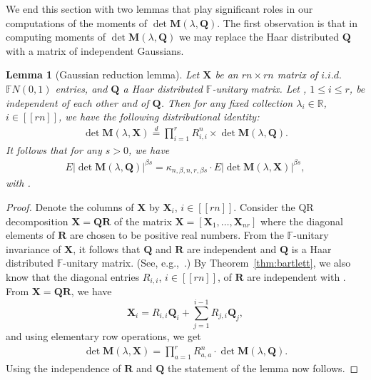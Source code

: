 \documentclass[pdftex]{sigma}
\numberwithin{equation}{section}
\newtheorem{Lemma}[Theorem]{Lemma}
\theoremstyle{definition}
\newcommand{\FF}{{\mathbb{F}}}
\newcommand{\R}{{\mathbb R}}
\def\eqd{\stackrel{d}{=}}
\newcommand{\lst}[1]{[\![#1 ]\!]}
\newcommand{\mbf}[1]{\mathbf{#1}}
\begin{document}
We end this section with two lemmas that play significant roles in our computations of the moments of $\det \mbf{M}({\lambda}, \mbf{Q})$. The first observation is that in computing moments of $\det \mbf{M}({\lambda}, \mbf{Q})$ we may replace the Haar distributed $\mbf{Q}$ with a matrix of independent Gaussians.


\begin{Lemma}[Gaussian reduction lemma]\label{lem:Gauss_red}
Let $\mbf{X}$ be an $rn \times rn$ matrix of $i.i.d.$ $\mathbb{F} N(0,1)$ entries, and $\mbf{Q}$ a Haar distributed $\mathbb{F}$-unitary matrix.
Let , $1\le i\le r$, be
independent of each other and of $\mbf{Q}$.
Then for any fixed collection $\lambda_i\in \R$, $i \in \lst{rn}$, we have the following distributional identity:
\begin{align*}
\det \mbf{M}({\lambda}, \mbf{X})\eqd \prod_{i=1}^{r} R_{i,i}^n \times
\det \mbf{M}({\lambda}, \mbf{Q}).
\end{align*}
It follows that for any $s>0$, we have
\begin{align*}
 E |{\det \mbf{M}({\lambda}, \mbf{Q})}|^{\beta s}=\kappa_{n,\beta, n,r, \beta s}
\cdot E |{\det \mbf{M}({\lambda}, \mbf{X})}|^{\beta s},
\end{align*}
with .
\end{Lemma}

\begin{proof}
Denote the columns of $\mbf{X}$ by $\mbf{X}_i$, $i\in \lst{rn}$. Consider the QR decomposition $\mathbf{X}=\mathbf{Q}\mathbf{R}$ of the matrix $\mathbf{X}=[\mathbf{X}_1, \dots, \mathbf{X}_{nr}]$ where the diagonal elements of $\mbf{R}$ are chosen to be positive real numbers. From the $\FF$-unitary invariance of $\mathbf{X}$, it follows that $\mathbf{Q}$ and $\mathbf{R}$ are independent and $\mathbf{Q}$ is a Haar distributed $\mathbb{F}$-unitary matrix. (See, e.g.,~\cite{Meckes2019}.)
By Theorem~\ref{thm:bartlett}, we also know that the diagonal entries $R_{i,i}$, $i\in \lst{rn}$, of $\mathbf{R}$ are independent with .
From $\mbf{X}=\mbf{Q}\mbf{R}$, we have
\[
\mbf{X}_i=R_{i,i} \mbf{Q}_i+\sum_{j=1}^{i-1} R_{j,i} \mbf{Q}_j,
\]
and using elementary row operations, we get
\begin{align*}\label{eq:magic_dist}
 \det\mbf{M}({\lambda}, \mbf{X})=\prod_{a=1}^r R_{a,a}^n
\cdot \det\mbf{M}({\lambda}, \mbf{Q}).
\end{align*}
Using the independence of $\mbf{R}$ and $\mbf{Q}$ the statement of the lemma now follows.
\end{proof}
\end{document}
